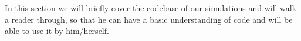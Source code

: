 In this section we will briefly cover the codebase of our simulations and will walk a reader through, so that he can have a basic understanding of code and will be able to use it by him/herself.